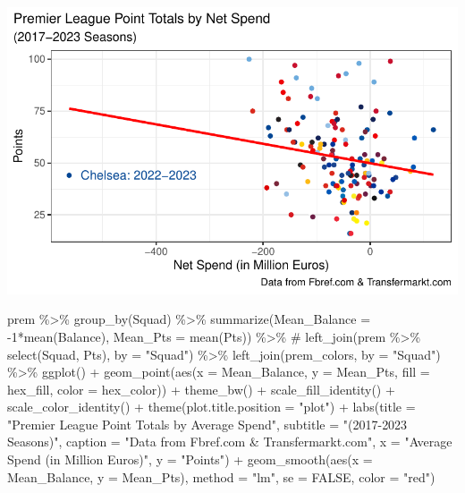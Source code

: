 \documentclass[
  letterpaper,
  DIV=11,
  numbers=noendperiod]{scrartcl}
\newenvironment{Shaded}{\begin{snugshade}}{\end{snugshade}}
\newcommand{\AttributeTok}[1]{\textcolor[rgb]{0.40,0.45,0.13}{#1}}
\newcommand{\CommentTok}[1]{\textcolor[rgb]{0.37,0.37,0.37}{#1}}
\newcommand{\ConstantTok}[1]{\textcolor[rgb]{0.56,0.35,0.01}{#1}}
\newcommand{\DecValTok}[1]{\textcolor[rgb]{0.68,0.00,0.00}{#1}}
\newcommand{\FunctionTok}[1]{\textcolor[rgb]{0.28,0.35,0.67}{#1}}
\newcommand{\NormalTok}[1]{\textcolor[rgb]{0.00,0.23,0.31}{#1}}
\newcommand{\SpecialCharTok}[1]{\textcolor[rgb]{0.37,0.37,0.37}{#1}}
\newcommand{\StringTok}[1]{\textcolor[rgb]{0.13,0.47,0.30}{#1}}
\begin{document}
\includegraphics{project_part_3_files/figure-pdf/net-spend-vs-points-l1-1.pdf}

\begin{Shaded}
\begin{Highlighting}[]
\NormalTok{prem }\SpecialCharTok{\%\textgreater{}\%}
  \FunctionTok{group\_by}\NormalTok{(Squad) }\SpecialCharTok{\%\textgreater{}\%}
  \FunctionTok{summarize}\NormalTok{(}\AttributeTok{Mean\_Balance =} \SpecialCharTok{{-}}\DecValTok{1}\SpecialCharTok{*}\FunctionTok{mean}\NormalTok{(Balance),}
            \AttributeTok{Mean\_Pts =} \FunctionTok{mean}\NormalTok{(Pts)) }\SpecialCharTok{\%\textgreater{}\%}
\CommentTok{\# left\_join(prem \%\textgreater{}\% select(Squad, Pts), by = "Squad") \%\textgreater{}\%}
  \FunctionTok{left\_join}\NormalTok{(prem\_colors, }\AttributeTok{by =} \StringTok{"Squad"}\NormalTok{) }\SpecialCharTok{\%\textgreater{}\%}
  \FunctionTok{ggplot}\NormalTok{() }\SpecialCharTok{+}
  \FunctionTok{geom\_point}\NormalTok{(}\FunctionTok{aes}\NormalTok{(}\AttributeTok{x =}\NormalTok{ Mean\_Balance, }\AttributeTok{y =}\NormalTok{ Mean\_Pts, }\AttributeTok{fill =}\NormalTok{ hex\_fill, }\AttributeTok{color =}\NormalTok{ hex\_color)) }\SpecialCharTok{+}
  \FunctionTok{theme\_bw}\NormalTok{() }\SpecialCharTok{+}
  \FunctionTok{scale\_fill\_identity}\NormalTok{() }\SpecialCharTok{+}
  \FunctionTok{scale\_color\_identity}\NormalTok{() }\SpecialCharTok{+}
  \FunctionTok{theme}\NormalTok{(}\AttributeTok{plot.title.position =} \StringTok{"plot"}\NormalTok{) }\SpecialCharTok{+}
  \FunctionTok{labs}\NormalTok{(}\AttributeTok{title =} \StringTok{"Premier League Point Totals by Average Spend"}\NormalTok{,}
  \AttributeTok{subtitle =} \StringTok{"(2017{-}2023 Seasons)"}\NormalTok{,}
       \AttributeTok{caption =} \StringTok{"Data from Fbref.com \& Transfermarkt.com"}\NormalTok{,}
       \AttributeTok{x =} \StringTok{"Average Spend (in Million Euros)"}\NormalTok{,}
       \AttributeTok{y =} \StringTok{"Points"}\NormalTok{) }\SpecialCharTok{+}
  \FunctionTok{geom\_smooth}\NormalTok{(}\FunctionTok{aes}\NormalTok{(}\AttributeTok{x =}\NormalTok{ Mean\_Balance, }\AttributeTok{y =}\NormalTok{ Mean\_Pts), }\AttributeTok{method =} \StringTok{"lm"}\NormalTok{, }\AttributeTok{se =} \ConstantTok{FALSE}\NormalTok{, }\AttributeTok{color =} \StringTok{"red"}\NormalTok{)}
\end{Highlighting}
\end{Shaded}
\end{document}
